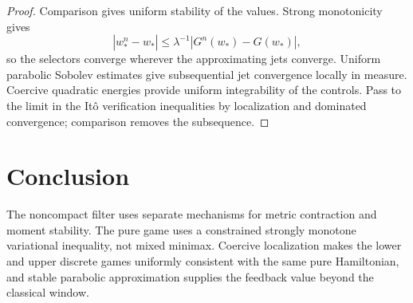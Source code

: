 \documentclass[11pt,reqno]{amsart}
\theoremstyle{definition}
\newcommand{\abs}[1]{\left\lvert#1\right\rvert}
\begin{document}
\begin{proof}
Comparison gives uniform stability of the values.  Strong monotonicity gives
\[
 \abs{w_*^n-w_*}
 \le\lambda^{-1}\abs{G^n(w_*)-G(w_*)},
\]
so the selectors converge wherever the approximating jets converge.  Uniform
parabolic Sobolev estimates give subsequential jet convergence locally in
measure.  Coercive quadratic energies provide uniform integrability of the
controls.  Pass to the limit in the It\^o verification inequalities by
localization and dominated convergence; comparison removes the subsequence.
\end{proof}

\section{Conclusion}

The noncompact filter uses separate mechanisms for metric contraction and
moment stability.  The pure game uses a constrained strongly monotone
variational inequality, not mixed minimax.  Coercive localization makes the
lower and upper discrete games uniformly consistent with the same pure
Hamiltonian, and stable parabolic approximation supplies the feedback value
beyond the classical window.



\end{document}
